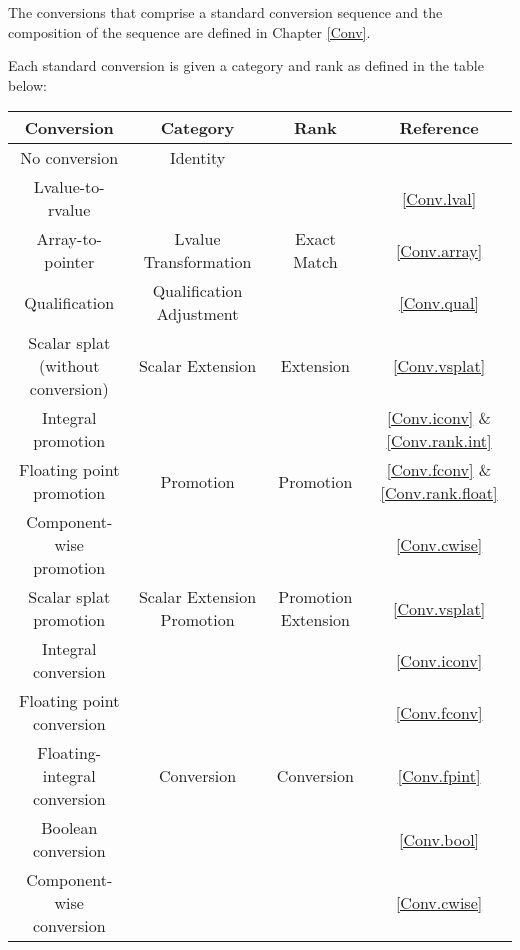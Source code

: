 
\p The conversions that comprise a standard conversion sequence and the
composition of the sequence are defined in Chapter \ref{Conv}.

\p Each standard conversion is given a category and rank as defined in the table
below:
\begin{center}
  \begin{tabular}{|| c | c | c | c ||}
    \hline
    Conversion & Category & Rank & Reference \\
    \hline
    No conversion & Identity &  & \\ \cline{1-2}\cline{4-4}

    Lvalue-to-rvalue & & & \ref{Conv.lval} \\ \cline{4-4}
    Array-to-pointer & Lvalue Transformation & Exact Match
          & \ref{Conv.array} \\ \cline{1-2}\cline{4-4}
    Qualification & Qualification Adjustment & & \ref{Conv.qual} \\ \cline{1-4}

    Scalar splat (without conversion) & Scalar Extension & Extension
          & \ref{Conv.vsplat} \\ \cline{1-4}

    Integral promotion & &
          & \ref{Conv.iconv} \& \ref{Conv.rank.int} \\ \cline{1-1}\cline{4-4}
    Floating point promotion & Promotion & Promotion
          & \ref{Conv.fconv} \& \ref{Conv.rank.float} \\ \cline{1-1}\cline{4-4}
    Component-wise promotion &  &  & \ref{Conv.cwise} \\ \cline{1-4}

    Scalar splat promotion & Scalar Extension Promotion & Promotion Extension
          & \ref{Conv.vsplat} \\ \cline{1-4}

    Integral conversion & & & \ref{Conv.iconv} \\ \cline{1-1}\cline{4-4}
    Floating point conversion &  &  & \ref{Conv.fconv} \\ \cline{1-1}\cline{4-4}
    Floating-integral conversion & Conversion & Conversion
          & \ref{Conv.fpint} \\ \cline{1-1}\cline{4-4}
    Boolean conversion &  &  & \ref{Conv.bool} \\ \cline{1-1}\cline{4-4}
    Component-wise conversion &  &  & \ref{Conv.cwise} \\ \cline{1-4}


\end{tabular}
\end{center}
